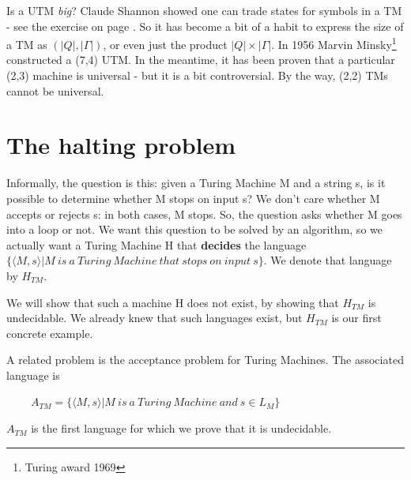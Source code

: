 Is a UTM {\em big}? Claude Shannon showed one can trade states for
symbols in a TM - see the exercise on page \pageref{twosymbols} . So it
has become a bit of a habit to express the size of a TM as
$(|Q|,|\Gamma|)$, or even just the product $|Q| \times |\Gamma|$. In
1956 Marvin Minsky\footnote{Turing award 1969} constructed a (7,4)
UTM. In the meantime, it has been proven that a particular (2,3)
machine is universal - but it is a bit controversial.  By the way, (2,2) TMs
cannot be universal.



\clearpage
\section{The halting problem}\label{halting}

Informally, the question is this: given a Turing Machine M and a
string s, is it possible to determine whether M stops on input s?
We don't care whether M accepts or rejects s: in both cases, M stops.
So, the question asks whether M goes into a loop or not. We want this
question to be solved by an algorithm, so we actually want a
Turing Machine H that {\bf decides} the language
%
$\{\langle M,s \rangle|
M~is~a~Turing~Machine~that~stops~on~input~s\}$. We denote that
language by $H_{TM}$.


We will show that such a machine H does not exist, by showing that
$H_{TM}$ is undecidable. We already knew that such languages exist, but $H_{TM}$ is our first concrete example.

A related problem is the acceptance problem for Turing Machines. The associated language is

$~~~~~~~~~~A_{TM} = \{\langle M,s \rangle| M~is~a~Turing~Machine~and~s
\in L_{M}\}$

$A_{TM}$ is the first language for which we prove that it is
undecidable.

